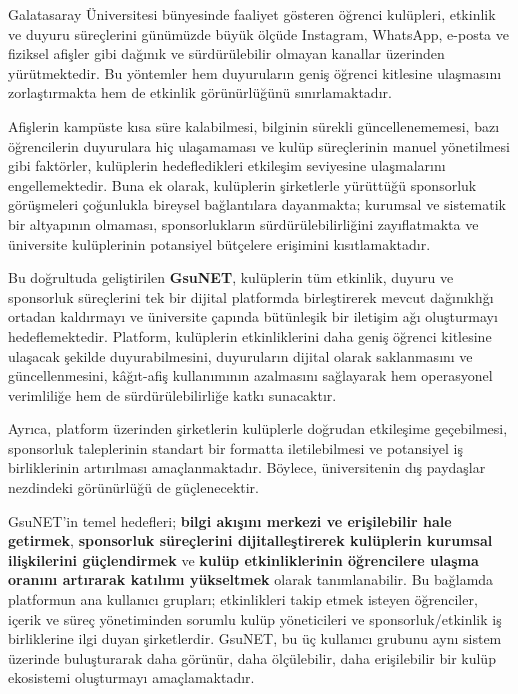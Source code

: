 \documentclass[a4paper,12pt]{report}
\begin{document}
Galatasaray Üniversitesi bünyesinde faaliyet gösteren öğrenci kulüpleri, etkinlik ve duyuru süreçlerini günümüzde büyük ölçüde Instagram, WhatsApp, e-posta ve fiziksel afişler gibi dağınık ve sürdürülebilir olmayan kanallar üzerinden yürütmektedir. Bu yöntemler hem duyuruların geniş öğrenci kitlesine ulaşmasını zorlaştırmakta hem de etkinlik görünürlüğünü sınırlamaktadır.

Afişlerin kampüste kısa süre kalabilmesi, bilginin sürekli güncellenememesi, bazı öğrencilerin duyurulara hiç ulaşamaması ve kulüp süreçlerinin manuel yönetilmesi gibi faktörler, kulüplerin hedefledikleri etkileşim seviyesine ulaşmalarını engellemektedir. Buna ek olarak, kulüplerin şirketlerle yürüttüğü sponsorluk görüşmeleri çoğunlukla bireysel bağlantılara dayanmakta; kurumsal ve sistematik bir altyapının olmaması, sponsorlukların sürdürülebilirliğini zayıflatmakta ve üniversite kulüplerinin potansiyel bütçelere erişimini kısıtlamaktadır.

Bu doğrultuda geliştirilen \textbf{GsuNET}, kulüplerin tüm etkinlik, duyuru ve sponsorluk süreçlerini tek bir dijital platformda birleştirerek mevcut dağınıklığı ortadan kaldırmayı ve üniversite çapında bütünleşik bir iletişim ağı oluşturmayı hedeflemektedir. Platform, kulüplerin etkinliklerini daha geniş öğrenci kitlesine ulaşacak şekilde duyurabilmesini, duyuruların dijital olarak saklanmasını ve güncellenmesini, kâğıt-afiş kullanımının azalmasını sağlayarak hem operasyonel verimliliğe hem de sürdürülebilirliğe katkı sunacaktır.

Ayrıca, platform üzerinden şirketlerin kulüplerle doğrudan etkileşime geçebilmesi, sponsorluk taleplerinin standart bir formatta iletilebilmesi ve potansiyel iş birliklerinin artırılması amaçlanmaktadır. Böylece, üniversitenin dış paydaşlar nezdindeki görünürlüğü de güçlenecektir.

GsuNET'in temel hedefleri; \textbf{bilgi akışını merkezi ve erişilebilir hale getirmek}, \textbf{sponsorluk süreçlerini dijitalleştirerek kulüplerin kurumsal ilişkilerini güçlendirmek} ve \textbf{kulüp etkinliklerinin öğrencilere ulaşma oranını artırarak katılımı yükseltmek} olarak tanımlanabilir. Bu bağlamda platformun ana kullanıcı grupları; etkinlikleri takip etmek isteyen öğrenciler, içerik ve süreç yönetiminden sorumlu kulüp yöneticileri ve sponsorluk/etkinlik iş birliklerine ilgi duyan şirketlerdir. GsuNET, bu üç kullanıcı grubunu aynı sistem üzerinde buluşturarak daha görünür, daha ölçülebilir, daha erişilebilir bir kulüp ekosistemi oluşturmayı amaçlamaktadır.
\end{document}
